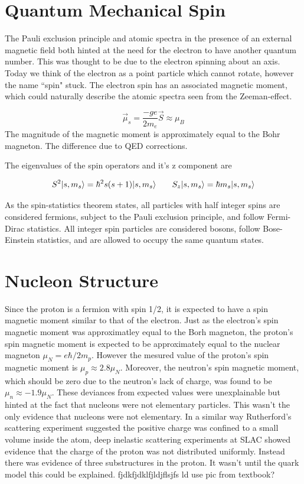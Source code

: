 \documentclass[abstract = on,listof=totoc, bibliography=totoc]{scrreprt}
\DeclarePairedDelimiter\ket{\lvert}{\rangle}
\begin{document}
\section{Quantum Mechanical Spin}

The Pauli exclusion principle and atomic spectra in the presence of an external magnetic field both hinted at the need for the electron to have another quantum number. This was thought to be due to the electron spinning about an axis. Today we think of the electron as a point particle which cannot rotate, however the name ``spin" stuck. The electron spin has an associated magnetic moment, which could naturally describe the atomic spectra seen from the Zeeman-effect.  

\begin{equation}
\vec{\mu}_s = \frac{-ge}{2m_e}\vec{S} \approx \mu_B
\end{equation}
The magnitude of the magnetic moment is approximately equal to the Bohr magneton. The difference due to QED corrections.

The eigenvalues of the spin operators and it's z component are 

\begin{equation}
S^2 \ket{s,m_s} = \hbar^2s(s+1)\ket{s,m_s} \;\;\;\;\;\;\; S_z \ket{s,m_s} = \hbar m_s \ket{s,m_s}
\end{equation}

As the spin-statistics theorem states, all particles with half integer spins are considered fermions, subject to the Pauli exclusion principle, and follow Fermi-Dirac statistics. All integer spin particles are considered bosons, follow Bose-Einstein statistics, and are allowed to occupy the same quantum states. 

\section{Nucleon Structure}

Since the proton is a fermion with spin 1/2, it is expected to have a spin magnetic moment similar to that of the electron. Just as the electron's spin magnetic moment was approximatley equal to the Borh magneton, the proton's spin magnetic moment is expected to be approximately equal to the nuclear magneton $\mu_N = e\hbar/2m_p$. However the mesured value of the proton's spin magnetic moment is $\mu_p \approx 2.8 \mu_N$. Moreover, the neutron's spin magnetic moment, which should be zero due to the neutron's lack of charge,  was found to be $\mu_n \approx -1.9\mu_N$. These deviances from expected values were unexplainable but hinted at the fact that nucleons were not elementary particles. This wasn't the only evidence that nucleons were not elementary.  In a similar way Rutherford's scattering experiment suggested the positive charge was confined to a small volume inside the atom, deep inelastic scattering experiments at SLAC showed evidence that the charge of the proton was not distributed uniformly. Instead there was evidence of three substructures in the proton. It wasn't until the quark model this could be explained.
fjdkfjdklfjldjflsjfs ld use pic from textbook?
\end{document}
